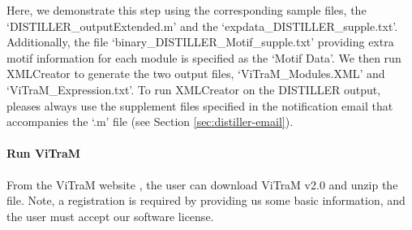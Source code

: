 Here, we demonstrate this step using the corresponding sample files, the
`DISTILLER\_outputExtended.m' and the `expdata\_DISTILLER\_supple.txt'.
%
Additionally, the file `binary\_DISTILLER\_Motif\_supple.txt' providing extra
motif information for each module is specified as the `Motif Data'.
%
We then run XMLCreator to generate the two output files, `ViTraM\_Modules.XML'
and `ViTraM\_Expression.txt'.
%
To run XMLCreator on the DISTILLER output, pleases always use the supplement
files specified in the notification email that accompanies the `.m' file (see
Section \ref{sec:distiller-email}).


\paragraph{Run ViTraM}

From the ViTraM website \cite{ViTraM}, the user can 
download ViTraM v2.0 and unzip the file. Note, a registration is required by 
providing us some basic information, and the user must accept our software 
license.

